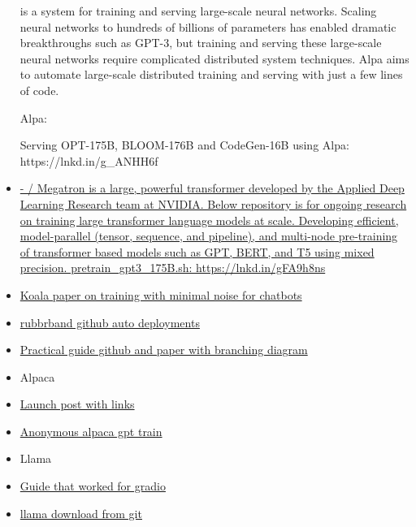 \begin{itemize}
       is a system for training and serving large-scale neural networks.
  Scaling neural networks to hundreds of billions of parameters has
  enabled dramatic breakthroughs such as GPT-3, but training and serving
  these large-scale neural networks require complicated distributed
  system techniques. Alpa aims to automate large-scale distributed
  training and serving with just a few lines of code.

   Alpa:

   Serving OPT-175B, BLOOM-176B and CodeGen-16B using Alpa:
  https://lnkd.in/g\_ANHH6f
\item
  \href{https://github.com/NVIDIA/Megatron-LM}{        -   / Megatron is
  a large, powerful transformer developed by the Applied Deep Learning
  Research team at NVIDIA. Below repository is for ongoing research on
  training large transformer language models at scale. Developing
  efficient, model-parallel (tensor, sequence, and pipeline), and
  multi-node pre-training of transformer based models such as GPT, BERT,
  and T5 using mixed precision.  pretrain\_gpt3\_175B.sh:
  https://lnkd.in/gFA9h8ns}
\item
  \href{https://bair.berkeley.edu/blog/2023/04/03/koala/?ref=emergentmind}{Koala
  paper on training with minimal noise for chatbots}
\item
  \href{https://rubbrband.com/}{rubbrband github auto deployments}
\item
  \href{https://github.com/Mooler0410/LLMsPracticalGuide}{Practical
  guide github and paper with branching diagram}
\item
  Alpaca
\item
  \href{https://crfm.stanford.edu/2023/03/13/alpaca.html}{Launch post
  with links}
\item
  \href{https://github.com/oobabooga/text-generation-webui/discussions/727}{Anonymous
  alpaca gpt train}
\item
  Llama
\item
  \href{https://aituts.com/llama/}{Guide that worked for gradio}
\item
  \href{https://github.com/shawwn/llama-dl}{llama download from git}

  \begin{itemize}
   

\end{itemize}
\end{itemize}
